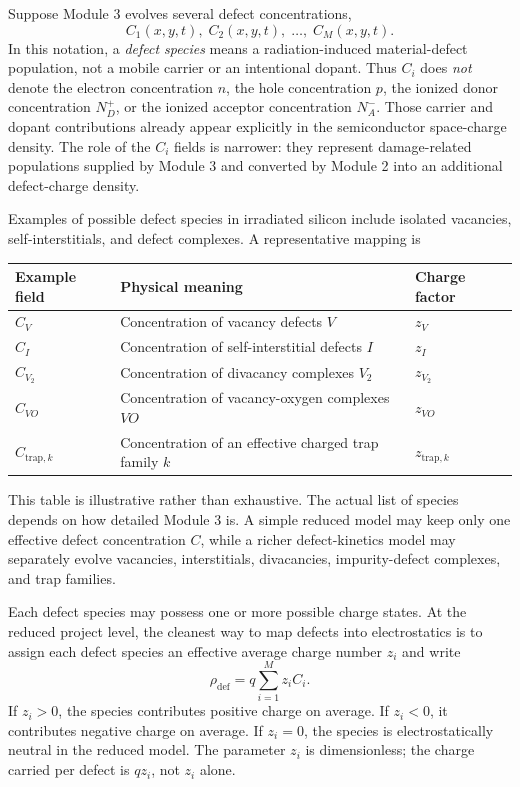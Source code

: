\documentclass[11pt]{article}
\begin{document}
Suppose Module 3 evolves several defect concentrations,
\begin{equation}
C_1(x,y,t),\; C_2(x,y,t),\; \dots,\; C_M(x,y,t).
\end{equation}
In this notation, a \emph{defect species} means a radiation-induced material-defect population, not a mobile carrier or an intentional dopant. Thus $C_i$ does \emph{not} denote the electron concentration $n$, the hole concentration $p$, the ionized donor concentration $N_D^+$, or the ionized acceptor concentration $N_A^-$. Those carrier and dopant contributions already appear explicitly in the semiconductor space-charge density. The role of the $C_i$ fields is narrower: they represent damage-related populations supplied by Module 3 and converted by Module 2 into an additional defect-charge density.

Examples of possible defect species in irradiated silicon include isolated vacancies, self-interstitials, and defect complexes. A representative mapping is
\begin{center}
\renewcommand{\arraystretch}{1.2}
\begin{tabular}{p{} p{} p{}}
\toprule
\textbf{Example field} & \textbf{Physical meaning} & \textbf{Charge factor} \\
\midrule
$C_V$ & Concentration of vacancy defects $V$ & $z_V$ \\
$C_I$ & Concentration of self-interstitial defects $I$ & $z_I$ \\
$C_{V_2}$ & Concentration of divacancy complexes $V_2$ & $z_{V_2}$ \\
$C_{VO}$ & Concentration of vacancy-oxygen complexes $VO$ & $z_{VO}$ \\
$C_{\mathrm{trap},k}$ & Concentration of an effective charged trap family $k$ & $z_{\mathrm{trap},k}$ \\
\bottomrule
\end{tabular}
\end{center}
This table is illustrative rather than exhaustive. The actual list of species depends on how detailed Module 3 is. A simple reduced model may keep only one effective defect concentration $C$, while a richer defect-kinetics model may separately evolve vacancies, interstitials, divacancies, impurity-defect complexes, and trap families.

Each defect species may possess one or more possible charge states. At the reduced project level, the cleanest way to map defects into electrostatics is to assign each defect species an effective average charge number $z_i$ and write
\begin{equation}
\rho_{\mathrm{def}} = q \sum_{i=1}^{M} z_i C_i.
\end{equation}
If $z_i>0$, the species contributes positive charge on average. If $z_i<0$, it contributes negative charge on average. If $z_i=0$, the species is electrostatically neutral in the reduced model. The parameter $z_i$ is dimensionless; the charge carried per defect is $qz_i$, not $z_i$ alone.
\end{document}
